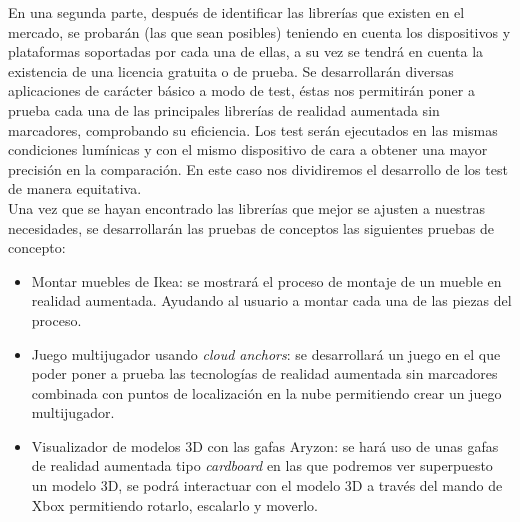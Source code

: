 En una segunda parte, después de identificar las librerías que existen en el mercado, se probarán (las que sean posibles) teniendo en cuenta los dispositivos y plataformas soportadas por cada una de ellas, a su vez se tendrá en cuenta la existencia de una licencia gratuita o de prueba. Se desarrollarán diversas aplicaciones de carácter básico a modo de test, éstas nos permitirán poner a prueba cada una de las principales librerías de realidad aumentada sin marcadores, comprobando su eficiencia. Los test serán ejecutados en las mismas condiciones lumínicas y con el mismo dispositivo de cara a obtener una mayor precisión en la comparación. En este caso nos dividiremos el desarrollo de los test de manera equitativa.\\

Una vez que se hayan encontrado las librerías que mejor se ajusten a nuestras necesidades, se desarrollarán las pruebas de conceptos las siguientes pruebas de concepto:
\begin{itemize}
\item Montar muebles de Ikea: se mostrará el proceso de montaje de un mueble en realidad aumentada. Ayudando al usuario a montar cada una de las piezas del proceso.
\item Juego multijugador usando \textit{cloud anchors}: se desarrollará un juego en el que poder poner a prueba las tecnologías de realidad aumentada sin marcadores combinada con puntos de localización en la nube permitiendo crear un juego multijugador.
\item Visualizador de modelos 3D con las gafas Aryzon: se hará uso de unas gafas de realidad aumentada tipo \textit{cardboard} en las que podremos ver superpuesto un modelo 3D, se podrá interactuar con el modelo 3D a través del mando de Xbox permitiendo rotarlo, escalarlo y moverlo.
\end{itemize}






















